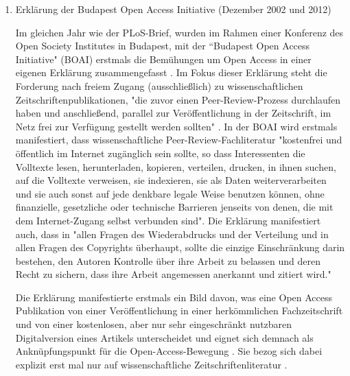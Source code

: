 \begin{enumerate}

\item Erklärung der Budapest Open Access Initiative (Dezember 2002 und 2012)

Im gleichen Jahr wie der PLoS-Brief, wurden im Rahmen einer Konferenz des Open Society Institutes in Budapest, mit der “Budapest Open Access Initiative" (BOAI)\cite{boai_2002} erstmals die Bemühungen um Open Access in einer eigenen Erklärung zusammengefasst \cite{yiotis_2013_open} \cite{garcia_2010_open} \cite{cite:21a}. Im Fokus dieser Erklärung steht die Forderung nach freiem Zugang (ausschließlich) zu wissenschaftlichen Zeitschriftenpublikationen, "die zuvor einen Peer-Review-Prozess durchlaufen haben und anschließend, parallel zur Veröffentlichung in der Zeitschrift, im Netz frei zur Verfügung gestellt werden sollten" \cite{Schirmbacher_oa_2007}. In der BOAI wird erstmals manifestiert, dass wissenschaftliche Peer-Review-Fachliteratur "kostenfrei und öffentlich im Internet zugänglich sein sollte, so dass Interessenten die Volltexte lesen, herunterladen, kopieren, verteilen, drucken, in ihnen suchen, auf die Volltexte verweisen, sie indexieren, sie als Daten weiterverarbeiten und sie auch sonst auf jede denkbare legale Weise benutzen können, ohne finanzielle, gesetzliche oder technische Barrieren jenseits von denen, die mit dem Internet-Zugang selbst verbunden sind". \cite{boai_2002} Die Erklärung manifestiert auch, dass in "allen Fragen des Wiederabdrucks und der Verteilung und in allen Fragen des Copyrights überhaupt, sollte die einzige Einschränkung darin bestehen, den Autoren Kontrolle über ihre Arbeit zu belassen und deren Recht zu sichern, dass ihre Arbeit angemessen anerkannt und zitiert wird." \cite{boai_2002}

Die Erklärung manifestierte erstmals ein Bild davon, was eine Open Access Publikation von einer Veröffentlichung in einer herkömmlichen Fachzeitschrift und von einer kostenlosen, aber nur sehr eingeschränkt nutzbaren Digitalversion eines Artikels unterscheidet und eignet sich demnach als Anknüpfungspunkt für die Open-Access-Bewegung \cite{naeder_2010_open}. Sie bezog sich dabei explizit erst mal nur auf wissenschaftliche Zeitschriftenliteratur \cite{boai_2002}.


\end{enumerate}
